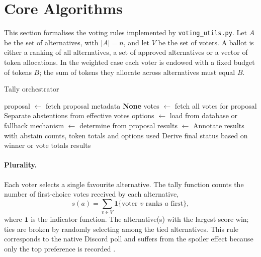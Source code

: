 \section{Core Algorithms}
\label{sec:algorithms}

This section formalises the voting rules implemented by
\texttt{voting\_utils.py}.  Let $A$ be the set of alternatives, with
\(|A|=n\), and let $V$ be the set of voters.  A ballot is either a
ranking of all alternatives, a set of approved alternatives or a
vector of token allocations.  In the weighted case each voter is
endowed with a fixed budget of tokens $B$; the sum of tokens they
allocate across alternatives must equal $B$.

\begin{algorithm}
    \caption{Tally orchestrator}\label{alg:tally_orchestrator}
    \begin{algorithmic}[1]
            \State proposal $\leftarrow$ fetch proposal metadata
             \State \Return \textbf{None} \EndIf
            \State votes $\leftarrow$ fetch all votes for proposal
            \State Separate abstentions from effective votes
            \State options $\leftarrow$ load from database or fallback
            \State mechanism $\leftarrow$ determine from proposal
            \State results $\leftarrow$ 
            \State Annotate results with abstain counts, token totals and options used
            \State Derive final status based on winner or vote totals
            \State \Return results
        \EndProcedure
    \end{algorithmic}
\end{algorithm}

\paragraph{Plurality.}  Each voter selects a single favourite
alternative.  The tally function counts the number of first‑choice
votes received by each alternative,
\begin{equation}
    s(a) = \sum_{v \in V} \mathbf{1}\{\text{voter }v\text{ ranks }a\text{ first}\},
\end{equation}
where $\mathbf{1}$ is the indicator function.  The alternative(s)
with the largest score win; ties are broken by randomly selecting
among the tied alternatives.  This rule corresponds to the native
Discord poll and suffers from the spoiler effect because only the
top preference is recorded \cite{Black1958}.

